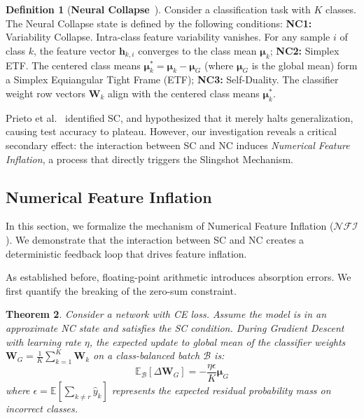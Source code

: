 \documentclass{article}
\theoremstyle{plain}
\newtheorem{theorem}{Theorem}[section]
\theoremstyle{definition}
\newtheorem{definition}[theorem]{Definition}
\theoremstyle{remark}
\begin{document}
\begin{definition}[\textbf{Neural Collapse}~\cite{papyan2020}]
Consider a classification task with $K$ classes. The Neural Collapse state is defined by the following conditions: 
\textbf{NC1:} Variability Collapse. Intra-class feature variability vanishes. For any sample $i$ of class $k$, the feature vector $\bm{h}_{k,i}$ converges to the class mean $\bm{\mu}_k$;
\textbf{NC2:} Simplex ETF. The centered class means $\bm{\mu}_k^* = \bm{\mu}_k - \bm{\mu}_G$ (where $\bm{\mu}_G$ is the global mean) form a Simplex Equiangular Tight Frame (ETF);
\textbf{NC3:} Self-Duality. The classifier weight row vectors $\bm{W}_k$ align with the centered class means $\bm{\mu}_k^*$.
\end{definition}

Prieto et al.~\cite{prieto2025} identified SC, 
and hypothesized that it merely halts generalization, causing test accuracy to plateau. 
However, our investigation reveals a critical secondary effect: 
the interaction between SC and NC induces \textit{Numerical Feature Inflation}, 
a process that directly triggers the Slingshot Mechanism.

\subsection{Numerical Feature Inflation}
\label{sec:nfc} 

In this section, we formalize the mechanism of Numerical Feature Inflation ($\mathcal{NFI}$). 
We demonstrate that the interaction between SC and NC creates 
a deterministic feedback loop that drives feature inflation.


As established before, floating-point arithmetic introduces absorption errors. 
We first quantify the breaking of the zero-sum constraint.

\begin{theorem}
\label{thm:weight_drift}
Consider a network with CE loss. 
Assume the model is in an approximate NC state and satisfies the SC condition. 
During Gradient Descent with learning rate $\eta$, 
the expected update to global mean of the classifier weights $\bm{W}_G= \frac{1}{K} \sum_{k=1}^K \bm{W}_k$ 
on a class-balanced batch $\mathcal{B}$ is:
\begin{equation}
    \mathbb{E}_{\mathcal{B}}[\Delta \bm{W}_G] = - \frac{\eta \epsilon }{K} \bm{\mu}_G
\end{equation}
where $\epsilon = \mathbb{E}[\sum_{k \neq r} \hat{y}_k]$ represents the expected residual probability mass on incorrect classes.
\end{theorem}
\end{document}
